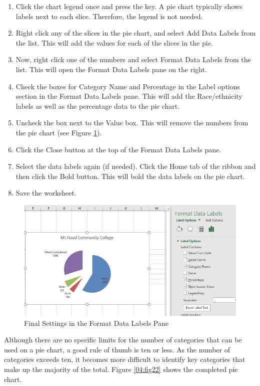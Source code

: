 \begin{enumerate}
	\item Click the chart legend once and press the  key. A pie chart typically shows labels next to each slice. Therefore, the legend is not needed.
	\item Right click any of the slices in the pie chart, and select Add Data Labels from the list. This will add the values for each of the slices in the pie.
	\item Now, right click one of the numbers and select Format Data Labels from the list. This will open the Format Data Labels pane on the right.
	\item Check the boxes for Category Name and Percentage in the Label options section in the Format Data Labels pane. This will add the Race/ethnicity labels as well as the percentage data to the pie chart.
	\item Uncheck the box next to the Value box. This will remove the numbers from the pie chart (see Figure \ref{04:fig21}).
	\item Click the Close button at the top of the Format Data Labels pane.
	\item Select the data labels again (if needed). Click the Home tab of the ribbon and then click the Bold button. This will bold the data labels on the pie chart.
	\item Save the worksheet.
\end{enumerate}

\begin{figure}[H]
	\centering
	\includegraphics[width=\maxwidth{.95\linewidth}]{gfx/ch04_fig21}
	\caption{Final Settings in the Format Data Labels Pane}
	\label{04:fig21}
\end{figure}

Although there are no specific limits for the number of categories that can be used on a pie chart, a good rule of thumb is ten or less. As the number of  categories exceeds ten, it becomes more difficult to identify key categories that make up the majority of the total. Figure \ref{04:fig22} shows the completed pie chart.


